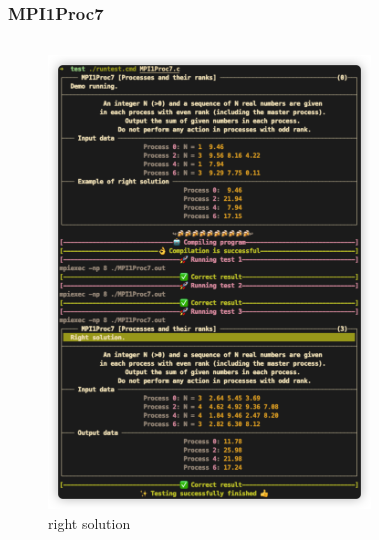 

\begin{frame}
\frametitle{MPI1Proc7}

\begin{columns}
\begin{figure}[htbp]%
    \centering
    \includegraphics[width=0.77
    \linewidth]{images/mpi1_eg_r.jpg}%
    \caption{right solution}%
    \label{right}%
\end{figure}
\begin{figure}[htbp]%
    \centering

\end{figure}
\end{columns}
\end{frame}
